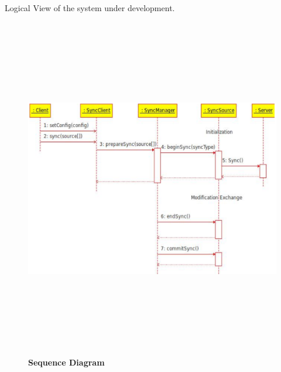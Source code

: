 Logical View of the system under development.\\[1cm]
\begin{figure}[H]
  \centering
    \includegraphics[height= 15cm, width=17cm]{project/images/seq-diagram}
  \caption{\textbf{Sequence Diagram}}
\end{figure}